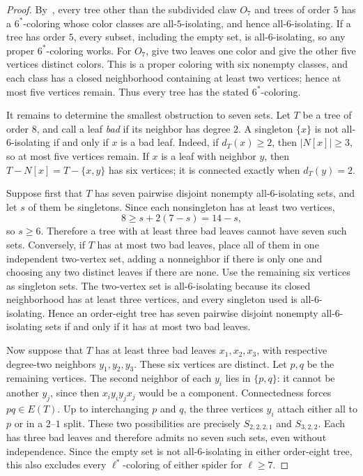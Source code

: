 \documentclass[11pt]{amsart}
\begin{document}
\begin{proof}
By~\cite[Theorem~7]{BFG}, every tree other than the subdivided claw $O_7$ and
trees of order $5$ has a $6^{*}$-coloring whose color classes are
all-$5$-isolating, and hence all-$6$-isolating.  If a tree has order $5$, every
subset, including the empty set, is all-$6$-isolating, so any proper
$6^{*}$-coloring works.  For $O_7$, give two leaves one color and give the
other five vertices distinct colors.  This is a proper coloring with six
nonempty classes, and each class has a closed neighborhood containing at
least two vertices; hence at most five vertices remain.  Thus every tree has
the stated $6^{*}$-coloring.

It remains to determine the smallest obstruction to seven sets.  Let $T$ be a
tree of order $8$, and call a leaf \emph{bad} if its neighbor has degree $2$.
A singleton $\{x\}$ is not all-$6$-isolating if and only if $x$ is a bad leaf.
Indeed, if $d_T(x)\geq 2$, then $|N[x]|\geq 3$, so at most five vertices
remain.  If $x$ is a leaf with neighbor $y$, then
$T-N[x]=T-\{x,y\}$ has six vertices; it is connected exactly when
$d_T(y)=2$.

Suppose first that $T$ has seven pairwise disjoint nonempty all-$6$-isolating
sets, and let $s$ of them be singletons.  Since each nonsingleton has at least
two vertices,
\[
  8\geq s+2(7-s)=14-s,
\]
so $s\geq 6$.  Therefore a tree with at least three bad leaves cannot have
seven such sets.  Conversely, if $T$ has at most two bad leaves, place all of
them in one independent two-vertex set, adding a nonneighbor if there is only
one and choosing any two distinct leaves if there are none.  Use the remaining
six vertices as singleton sets.  The two-vertex set is all-$6$-isolating
because its closed neighborhood has at least three vertices, and every
singleton used is all-$6$-isolating.  Hence an order-eight tree has seven
pairwise disjoint nonempty all-$6$-isolating sets if and only if it has at
most two bad leaves.

Now suppose that $T$ has at least three bad leaves $x_1,x_2,x_3$, with
respective degree-two neighbors $y_1,y_2,y_3$.  These six vertices are
distinct.  Let $p,q$ be the remaining vertices.  The second neighbor of each
$y_i$ lies in $\{p,q\}$: it cannot be another $y_j$, since then
$x_i y_i y_j x_j$ would be a component.  Connectedness forces
$pq\in E(T)$.  Up to interchanging $p$ and $q$, the three vertices $y_i$
attach either all to $p$ or in a $2$--$1$ split.  These two possibilities are
precisely $S_{2,2,2,1}$ and $S_{3,2,2}$.  Each has three bad leaves and
therefore admits no seven such sets, even without independence.  Since the
empty set is not all-$6$-isolating in either order-eight tree, this also
excludes every $\ell^{*}$-coloring of either spider for $\ell\geq 7$.


\end{proof}
\end{document}
